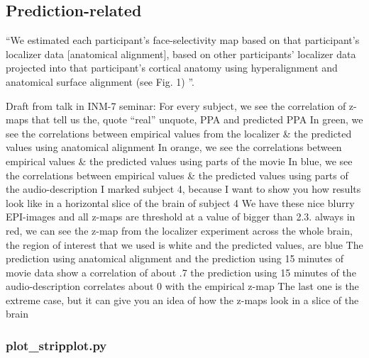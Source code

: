 



\subsection{Prediction-related}



``We estimated each participant's face-selectivity map based on that
participant’s localizer data [anatomical alignment], based on other
participants' localizer data projected into that participant's cortical anatomy
using hyperalignment and anatomical surface alignment (see Fig. 1)
\citep{jiahui2020predicting}''.

%
Draft from talk in INM-7 seminar:
%
For every subject, we see the correlation of z-maps that tell us the, quote
``real'' unquote, PPA and predicted PPA
%
In green, we see the correlations between empirical values from the localizer \&
the predicted values using anatomical alignment
%
In orange, we see the correlations between empirical values \& the predicted
values using parts of the movie
%
In blue, we see the correlations between empirical values \& the predicted
values using parts of the audio-description
%
I marked subject 4, because I want to show you how results look like in a
horizontal slice of the brain of subject 4
%
We have these nice blurry EPI-images and all z-maps are threshold at a value of
bigger than 2.3.
%
always in red, we can see the z-map from the localizer experiment across the
whole brain,
%
the region of interest that we used is white and the predicted values, are blue
%
The prediction using anatomical alignment and the prediction using 15 minutes of
movie data show a correlation of about .7
%
the prediction using 15 minutes of the audio-description correlates about 0 with
the empirical z-map
%
The last one is the extreme case, but it can give you an idea of how the z-maps
look in a slice of the brain


\subsubsection{plot\_stripplot.py}

